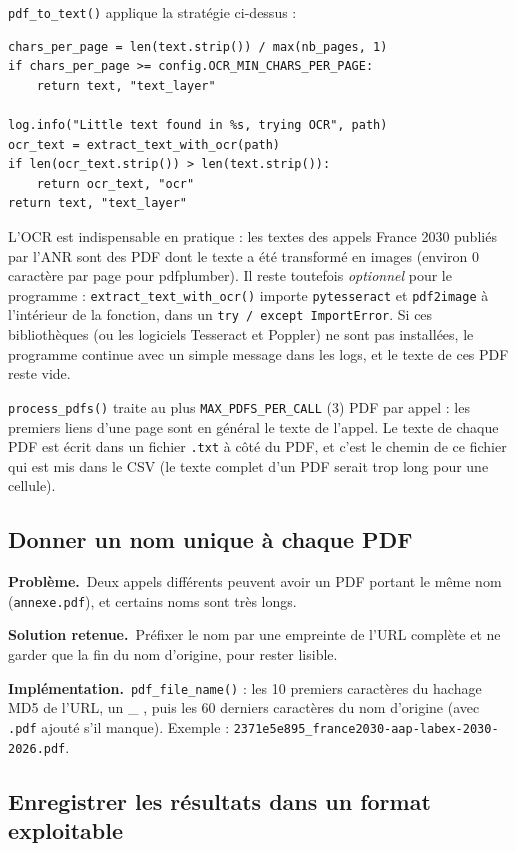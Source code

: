 \documentclass[11pt,a4paper]{article}
\newcommand{\pb}{\par\medskip\noindent\textbf{\textcolor{pbcolor}{Problème.}}\ }
\newcommand{\sol}{\par\medskip\noindent\textbf{\textcolor{solcolor}{Solution retenue.}}\ }
\newcommand{\impl}{\par\medskip\noindent\textbf{\textcolor{implcolor}{Implémentation.}}\ }
\newcommand{\code}[1]{\texttt{#1}}
\begin{document}
\code{pdf\_to\_text()} applique la stratégie ci-dessus :

\begin{lstlisting}
chars_per_page = len(text.strip()) / max(nb_pages, 1)
if chars_per_page >= config.OCR_MIN_CHARS_PER_PAGE:
    return text, "text_layer"

log.info("Little text found in %s, trying OCR", path)
ocr_text = extract_text_with_ocr(path)
if len(ocr_text.strip()) > len(text.strip()):
    return ocr_text, "ocr"
return text, "text_layer"
\end{lstlisting}

L'OCR est indispensable en pratique : les textes des appels France 2030 publiés par l'ANR
sont des PDF dont le texte a été transformé en images (environ 0 caractère par page pour
pdfplumber). Il reste toutefois \emph{optionnel} pour le programme :
\code{extract\_text\_with\_ocr()} importe \code{pytesseract} et \code{pdf2image} à
l'intérieur de la fonction, dans un \code{try / except ImportError}. Si ces bibliothèques
(ou les logiciels Tesseract et Poppler) ne sont pas installées, le programme continue avec
un simple message dans les logs, et le texte de ces PDF reste vide.

\code{process\_pdfs()} traite au plus \code{MAX\_PDFS\_PER\_CALL} (3) PDF par appel : les
premiers liens d'une page sont en général le texte de l'appel. Le texte de chaque PDF est
écrit dans un fichier \code{.txt} à côté du PDF, et c'est le chemin de ce fichier qui est
mis dans le CSV (le texte complet d'un PDF serait trop long pour une cellule).

\subsection{Donner un nom unique à chaque PDF}

\pb Deux appels différents peuvent avoir un PDF portant le même nom
(\code{annexe.pdf}), et certains noms sont très longs.

\sol Préfixer le nom par une empreinte de l'URL complète et ne garder que la fin du nom
d'origine, pour rester lisible.

\impl \code{pdf\_file\_name()} : les 10 premiers caractères du hachage MD5 de l'URL, un
\og \_ \fg, puis les 60 derniers caractères du nom d'origine (avec \code{.pdf} ajouté s'il
manque). Exemple : \code{2371e5e895\_france2030-aap-labex-2030-2026.pdf}.

\subsection{Enregistrer les résultats dans un format exploitable}
\end{document}
